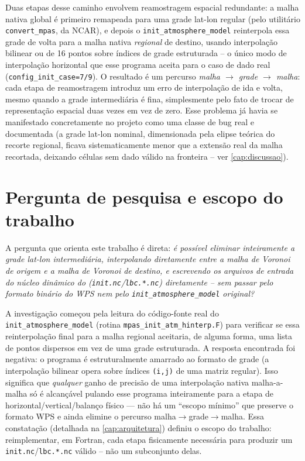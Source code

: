Duas etapas desse caminho envolvem reamostragem espacial redundante: a
malha nativa global é primeiro remapeada para uma grade lat-lon regular
(pelo utilitário \texttt{convert\_mpas}, da NCAR), e depois o
\texttt{init\_atmosphere\_model} reinterpola essa grade de volta para a
malha nativa \emph{regional} de destino, usando interpolação bilinear ou
de 16 pontos sobre índices de grade estruturada -- o único modo de
interpolação horizontal que esse programa aceita para o caso de dado
real (\texttt{config\_init\_case=7/9}). O resultado é um percurso
\emph{malha $\to$ grade $\to$ malha}: cada etapa de reamostragem introduz
um erro de interpolação de ida e volta, mesmo quando a grade
intermediária é fina, simplesmente pelo fato de trocar de representação
espacial duas vezes em vez de zero. Esse problema já havia se manifestado
concretamente no projeto como uma classe de bug real e documentada (a
grade lat-lon nominal, dimensionada pela elipse teórica do recorte
regional, ficava sistematicamente menor que a extensão real da malha
recortada, deixando células sem dado válido na fronteira -- ver
\cref{cap:discussao}).

\section{Pergunta de pesquisa e escopo do trabalho}

A pergunta que orienta este trabalho é direta: \emph{é possível eliminar
inteiramente a grade lat-lon intermediária, interpolando diretamente
entre a malha de Voronoi de origem e a malha de Voronoi de destino, e
escrevendo os arquivos de entrada do núcleo dinâmico do \mpasa{}
(\texttt{init.nc}/\texttt{lbc.*.nc}) diretamente -- sem passar pelo
formato binário do WPS nem pelo \texttt{init\_atmosphere\_model}
original?}

A investigação começou pela leitura do código-fonte real do
\texttt{init\_atmosphere\_model} (rotina
\texttt{mpas\_init\_atm\_hinterp.F}) para verificar se essa reinterpolação
final para a malha regional aceitaria, de alguma forma, uma lista de
pontos dispersos em vez de uma grade estruturada. A resposta encontrada
foi negativa: o programa é estruturalmente amarrado ao formato de grade
(a interpolação bilinear opera sobre índices \texttt{(i,j)} de uma matriz
regular). Isso significa que \emph{qualquer} ganho de precisão de uma
interpolação nativa malha-a-malha só é alcançável pulando esse programa
inteiramente para a etapa de horizontal/vertical/balanço físico --- não
há um ``escopo mínimo'' que preserve o formato WPS e ainda elimine o
percurso malha$\to$grade$\to$malha. Essa constatação (detalhada na
\cref{cap:arquitetura}) definiu o escopo do trabalho: reimplementar, em
Fortran, cada etapa fisicamente necessária para produzir um
\texttt{init.nc}/\texttt{lbc.*.nc} válido -- não um subconjunto delas.


